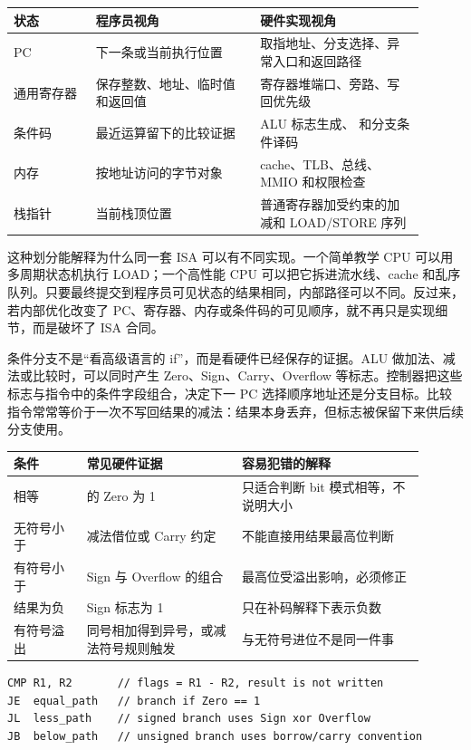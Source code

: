 \begin{longtable}{L{0.18\linewidth}L{0.36\linewidth}L{0.36\linewidth}}
\toprule
状态 & 程序员视角 & 硬件实现视角 \\
\midrule
PC & 下一条或当前执行位置 & 取指地址、分支选择、异常入口和返回路径 \\
通用寄存器 & 保存整数、地址、临时值和返回值 & 寄存器堆端口、旁路、写回优先级 \\
条件码 & 最近运算留下的比较证据 & ALU 标志生成、 和分支条件译码 \\
内存 & 按地址访问的字节对象 & cache、TLB、总线、MMIO 和权限检查 \\
栈指针 & 当前栈顶位置 & 普通寄存器加受约束的加减和 LOAD/STORE 序列 \\
\bottomrule
\end{longtable}

这种划分能解释为什么同一套 ISA 可以有不同实现。一个简单教学 CPU 可以用多周期状态机执行 LOAD；一个高性能 CPU 可以把它拆进流水线、cache 和乱序队列。只要最终提交到程序员可见状态的结果相同，内部路径可以不同。反过来，若内部优化改变了 PC、寄存器、内存或条件码的可见顺序，就不再只是实现细节，而是破坏了 ISA 合同。

条件分支不是“看高级语言的 if”，而是看硬件已经保存的证据。ALU 做加法、减法或比较时，可以同时产生 Zero、Sign、Carry、Overflow 等标志。控制器把这些标志与指令中的条件字段组合，决定下一 PC 选择顺序地址还是分支目标。比较指令常常等价于一次不写回结果的减法：结果本身丢弃，但标志被保留下来供后续分支使用。

\begin{longtable}{L{0.16\linewidth}L{0.34\linewidth}L{0.4\linewidth}}
\toprule
条件 & 常见硬件证据 & 容易犯错的解释 \\
\midrule
相等 &  的 Zero 为 1 & 只适合判断 bit 模式相等，不说明大小 \\
无符号小于 & 减法借位或 Carry 约定 & 不能直接用结果最高位判断 \\
有符号小于 & Sign 与 Overflow 的组合 & 最高位受溢出影响，必须修正 \\
结果为负 & Sign 标志为 1 & 只在补码解释下表示负数 \\
有符号溢出 & 同号相加得到异号，或减法符号规则触发 & 与无符号进位不是同一件事 \\
\bottomrule
\end{longtable}

\begin{lstlisting}
CMP R1, R2       // flags = R1 - R2, result is not written
JE  equal_path   // branch if Zero == 1
JL  less_path    // signed branch uses Sign xor Overflow
JB  below_path   // unsigned branch uses borrow/carry convention
\end{lstlisting}

